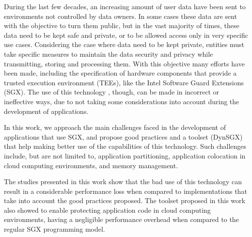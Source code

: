 During the last few decades, an increasing amount of user data have been sent
to environments not controlled by data owners. In some cases these data are sent with
the objective to turn them public, but in the vast majority of times, these data
need to be kept safe and private, or to be allowed access only in very specific
use cases. Considering the case where data need to be kept private, entities
must take specific measures to maintain the data security and privacy while
transmitting, storing and processing them. With this objective many efforts
have been made, including the specification of hardware components that provide
a trusted execution environment (TEEs), like the Intel Software Guard Extensions
(SGX). The use of this technology , though, can be made in incorrect or
ineffective ways, due to not taking some considerations into account during the
development of applications.

In this work, we approach the main challenges faced in the development of
applications that use SGX, and propose good practices and a toolset (DynSGX)
that help making better use of the capabilities of this technology. Such
challenges include, but are not limited to, application partitioning,
application colocation in cloud computing environments, and memory management.

The studies presented in this work show that the bad use of this technology can
result in a considerable performance loss when compared to
implementations that take into account the good practices proposed. The toolset
proposed in this work also showed to enable protecting application code in cloud
computing environments, having a negligible performance overhead when
compared to the regular SGX programming model.